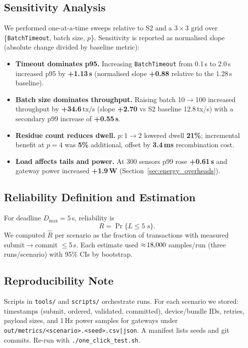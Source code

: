 \documentclass[12pt,onecolumn]{IEEEtran} %
\begin{document}
\subsection{Sensitivity Analysis}
\label{sec:sensitivity}

We performed one-at-a-time sweeps relative to S2 and a $3{\times}3$ grid over \{\texttt{BatchTimeout}, batch size, $p$\}. Sensitivity is reported as normalised slope (absolute change divided by baseline metric):

\begin{itemize}
  \item \textbf{Timeout dominates p95.} Increasing \texttt{BatchTimeout} from 0.1\,s to 2.0\,s increased p95 by \textbf{+1.13\,s} (normalised slope \textbf{+0.88} relative to the 1.28\,s baseline).
  \item \textbf{Batch size dominates throughput.} Raising batch 10$\to$100 increased throughput by \textbf{+34.6}\,tx/s (slope \textbf{+2.70} vs S2 baseline 12.8\,tx/s) with a secondary p99 increase of \textbf{+0.55\,s}.
  \item \textbf{Residue count reduces dwell.} $p:1\to2$ lowered dwell \textbf{21\%}; incremental benefit at $p{=}4$ was \textbf{5\%} additional, offset by \textbf{3.4\,ms} recombination cost.
  \item \textbf{Load affects tails and power.} At 300 sensors p99 rose \textbf{+0.61\,s} and gateway power increased \textbf{+1.9\,W} (Section~\ref{sec:energy_overheads}).
\end{itemize}

\subsection{Reliability Definition and Estimation}
\label{sec:reliability-formula}

For deadline \(D_{\max}{=}5\)\,s, reliability is
\[
  R=\Pr\{L \le 5\text{ s}\}.
\]
We computed $\hat R$ per scenario as the fraction of transactions with measured submit$\to$commit $\le$5\,s. Each estimate used \(\approx\!18{\small,}000\) samples/run (three runs/scenario) with 95\% CIs by bootstrap.

\subsection{Reproducibility Note}
\label{sec:reproducibility}

Scripts in \texttt{tools/} and \texttt{scripts/} orchestrate runs. For each scenario we stored:
timestamps (submit, ordered, validated, committed), device/bundle IDs, retries, payload sizes, and 1\,Hz power samples for gateways under \texttt{out/metrics/<scenario>.<seed>.csv|json}. A manifest lists seeds and git commits. Re-run with \texttt{./one\_click\_test.sh}.
\end{document}
